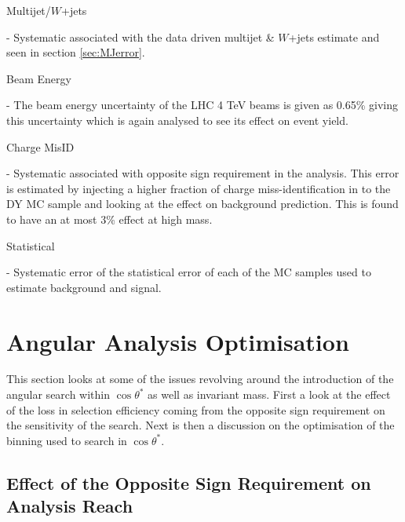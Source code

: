     {\bf\raggedright Multijet/$W$+jets} - Systematic associated with the data driven multijet \& $W$+jets estimate and seen in section \ref{sec:MJerror}. \\
    {\bf\raggedright Beam Energy} - The beam energy uncertainty of the LHC 4 TeV beams is given as 0.65\% giving this uncertainty which is again analysed to see its effect on event yield. \\
    {\bf\raggedright Charge MisID} - Systematic associated with opposite sign requirement in the analysis. This error is estimated by injecting a higher fraction of charge miss-identification in to the DY MC sample and looking at the effect on background prediction. This is found to have an at most 3\% effect at high mass. \\
    {\bf\raggedright Statistical} - Systematic error of the statistical error of each of the MC samples used to estimate background and signal. \\






\section{Angular Analysis Optimisation}


This section looks at some of the issues revolving around the introduction of the angular search within $\cos{\theta^{*}}$ as well as invariant mass. First a look at the effect of the loss in selection efficiency coming from the opposite sign requirement on the sensitivity of the search. Next is then a discussion on the optimisation of the binning used to search in $\cos{\theta^{*}}$.

\subsection{Effect of the Opposite Sign Requirement on Analysis Reach}
    \label{sec:oppSign}


